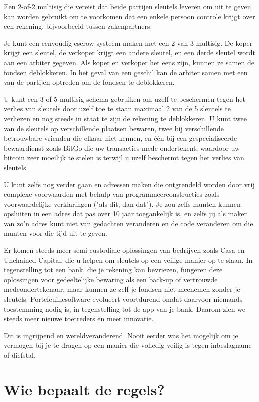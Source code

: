 \documentclass[
  letterpaper,
]{scrbook}
\begin{document}
Een 2-of-2 multisig die vereist dat beide partijen sleutels leveren om
uit te geven kan worden gebruikt om te voorkomen dat een enkele persoon
controle krijgt over een rekening, bijvoorbeeld tussen zakenpartners.

Je kunt een eenvoudig escrow-systeem maken met een 2-van-3 multisig. De
koper krijgt een sleutel, de verkoper krijgt een andere sleutel, en een
derde sleutel wordt aan een arbiter gegeven. Als koper en verkoper het
eens zijn, kunnen ze samen de fondsen deblokkeren. In het geval van een
geschil kan de arbiter samen met een van de partijen optreden om de
fondsen te deblokkeren.

U kunt een 3-of-5 multisig schema gebruiken om uzelf te beschermen tegen
het verlies van sleutels door uzelf toe te staan maximaal 2 van de 5
sleutels te verliezen en nog steeds in staat te zijn de rekening te
deblokkeren. U kunt twee van de sleutels op verschillende plaatsen
bewaren, twee bij verschillende betrouwbare vrienden die elkaar niet
kennen, en één bij een gespecialiseerde bewaardienst zoals BitGo die uw
transacties mede ondertekent, waardoor uw bitcoin zeer moeilijk te
stelen is terwijl u uzelf beschermt tegen het verlies van sleutels.

U kunt zelfs nog verder gaan en adressen maken die ontgrendeld worden
door vrij complexe voorwaarden met behulp van programmeerconstructies
zoals voorwaardelijke verklaringen ("als dit, dan dat"). Je zou zelfs
munten kunnen opsluiten in een adres dat pas over 10 jaar toegankelijk
is, en zelfs jij als maker van zo'n adres kunt niet van gedachten
veranderen en de code veranderen om die munten voor die tijd uit te
geven.

Er komen steeds meer semi-custodiale oplossingen van bedrijven zoals
Casa en Unchained Capital, die u helpen om sleutels op een veilige
manier op te slaan. In tegenstelling tot een bank, die je rekening kan
bevriezen, fungeren deze oplossingen voor gedeeltelijke bewaring als een
back-up of vertrouwde medeondertekenaar, maar kunnen ze zelf je fondsen
niet meenemen zonder je sleutels. Portefeuillesoftware evolueert
voortdurend omdat daarvoor niemands toestemming nodig is, in
tegenstelling tot de app van je bank. Daarom zien we steeds meer nieuwe
toetreders en meer innovatie.

Dit is ingrijpend en wereldveranderend. Nooit eerder was het mogelijk om
je vermogen bij je te dragen op een manier die volledig veilig is tegen
inbeslagname of diefstal.

\hypertarget{wie-bepaalt-de-regels}{%
\chapter{Wie bepaalt de regels?}\label{wie-bepaalt-de-regels}}
\end{document}
